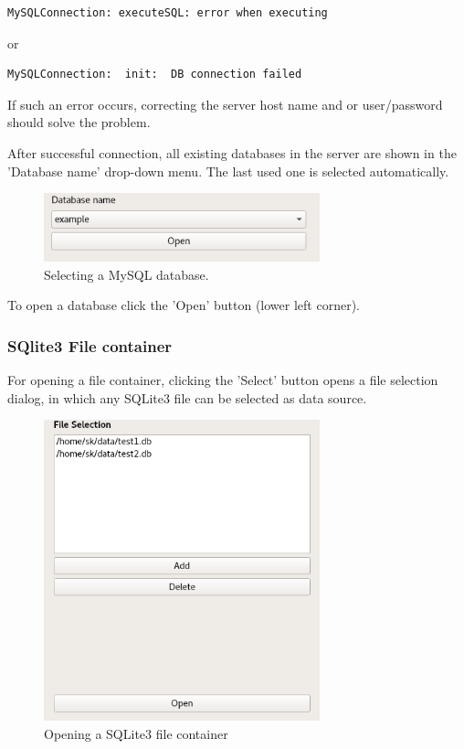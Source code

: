 \documentclass[10pt,letterpaper,extrafontsizes]{memoir}
\begin{document}
\begin{verbatim}
MySQLConnection: executeSQL: error when executing
\end{verbatim}
 or 
\begin{verbatim}
MySQLConnection:  init:  DB connection failed
\end{verbatim} 

If such an error occurs, correcting the server host name and or user/password should solve the problem.

After successful connection, all existing databases in the server are shown in the 'Database name' drop-down menu. The last used one is selected automatically.

\begin{figure}[H]
  \center
    \includegraphics[width=8cm]{../screenshots/mysql_database_selection.png}
  \caption{Selecting a MySQL database.}
  \label{fig:mysql_db_select}
\end{figure}


To open a database click the 'Open' button (lower left corner).

\subsubsection{SQlite3 File container}
For opening a file container, clicking the 'Select' button opens a file selection dialog, in which any SQLite3 file can be selected as data source.

\begin{figure}[H]
  \center
    \includegraphics[width=8cm]{../screenshots/sqlite3_open.png}
  \caption{Opening a SQLite3 file container}
  \label{fig:sqlite3_open}
\end{figure}
\end{document}
